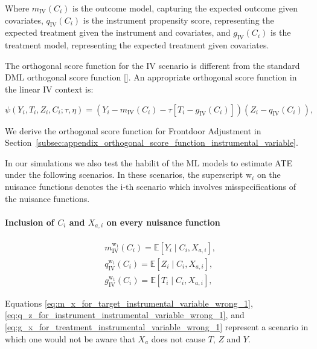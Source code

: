 \documentclass{article}
\numberwithin{equation}{section}
\begin{document}
Where $m_{\text{IV}}(C_i)$ is the outcome model, capturing the expected outcome given covariates, $q_{\text{IV}}(C_i)$ is the instrument propensity score, representing the expected treatment given the instrument and covariates, and $g_{\text{IV}}(C_i)$ is the treatment model, representing the expected treatment given covariates.

The orthogonal score function for the IV scenario is different from the standard DML orthogonal score function [\cite{BelloniChernozhukovHansen2014, ChernozhukovChetverikovDemireretal2018}]. An appropriate orthogonal score function in the linear IV context is:

\begin{equation}
    \psi(Y_i, T_i, Z_i, C_i; \tau, \eta) = \left( Y_i - m_{\text{IV}}(C_i) - \tau [T_i - g_{\text{IV}}(C_i)] \right) \left( Z_i - q_{\text{IV}}(C_i) \right),
    \label{eq:orthogonal_score_iv}
\end{equation}

We derive the orthogonal score function for Frontdoor Adjustment in Section~\ref{subsec:appendix_orthogonal_score_function_instrumental_variable}.

In our simulations we also test the habilit of the ML models to estimate ATE under the following scenarios. In these scenarios, the superscript $\text{w}_i$ on the nuisance functions denotes the i-th scenario which involves misspecifications of the nuisance functions.

\paragraph{Inclusion of $C_i$ and $X_{a, i}$ on every nuisance function}

\begin{align}
    & m_{\text{IV}}^{\text{w}_1}(C_i) = \mathbb{E}[Y_i \mid C_i, X_{a, i}],
    \label{eq:m_x_for_target_instrumental_variable_wrong_1} \\
    & q_{\text{IV}}^{\text{w}_1}(C_i) = \mathbb{E}[Z_i \mid C_i, X_{a, i}],
    \label{eq:q_z_for_instrument_instrumental_variable_wrong_1} \\
    & g_{\text{IV}}^{\text{w}_1}(C_i) = \mathbb{E}[T_i \mid C_i, X_{a, i}],
    \label{eq:g_x_for_treatment_instrumental_variable_wrong_1}
\end{align}

Equations \eqref{eq:m_x_for_target_instrumental_variable_wrong_1}, \eqref{eq:q_z_for_instrument_instrumental_variable_wrong_1}, and \eqref{eq:g_x_for_treatment_instrumental_variable_wrong_1} represent a scenario in which one would not be aware that $X_a$ does not cause $T$, $Z$ and $Y$.
\end{document}
